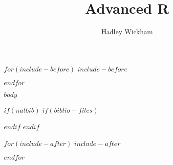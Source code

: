 \documentclass[oneside]{book}
\title{Advanced R}
\author{Hadley Wickham}
\date{}
\begin{document}
\maketitle

$for(include-before)$
$include-before$

$endfor$

{
\hypersetup{linkcolor=black}
\setcounter{tocdepth}{3}
\tableofcontents
}

$body$

$if(natbib)$
$if(biblio-files)$

$endif$
$endif$

$for(include-after)$
$include-after$

$endfor$
\end{document}

